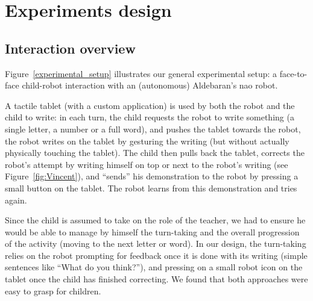 \documentclass{sig-alternate}
\begin{document}

\section{Experiments design}
\subsection{Interaction overview}
Figure~\ref{experimental_setup} illustrates our general experimental setup: a
face-to-face child-robot interaction with an (autonomous) Aldebaran's {\sc nao}
robot.

A tactile tablet (with a custom application) is used by both the robot and the
child to write: in each turn, the child requests the robot to write
something (a single letter, a number or a full word), and pushes the tablet
towards the robot, the robot writes on the tablet by gesturing the writing (but
without actually physically touching the tablet). The child then pulls back the
tablet, corrects the robot's attempt by writing himself on top or next to
the robot's writing (see Figure~\ref{fig:Vincent}), and ``sends'' his
demonstration to the robot by pressing a small button on the tablet. The robot
learns from this demonstration and tries again.

Since the child is assumed to take on the role of the teacher, we had to ensure
he would be able to manage by himself the turn-taking and the overall
progression of the activity (moving to the next letter or word). In our design,
the turn-taking relies on the robot prompting for feedback once it is done with
its writing (simple sentences like ``What do you think?''), and pressing on a
small robot icon on the tablet once the child has finished correcting. We found that both approaches were easy to grasp for children.
\end{document}

